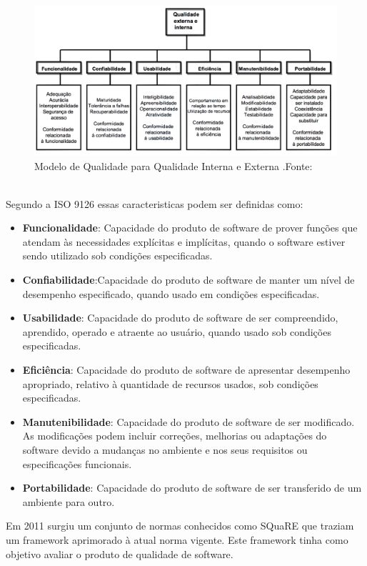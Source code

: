  \graphicspath{{figuras/}}
\begin{figure}
\centering
\includegraphics[scale=0.50]{Modelo_de_Qualidade}
\caption{Modelo de Qualidade para Qualidade Interna e Externa .Fonte:\cite{_nbr_2016}}
\label{img:modelo_qualidade}
\end{figure}
\\Segundo a ISO 9126 essas caracteristicas podem ser definidas como:
\begin{itemize}
\item \textbf{Funcionalidade}: Capacidade do produto de software de prover funções que atendam às necessidades explícitas e implícitas, quando o software estiver sendo utilizado sob condições especificadas.
\item \textbf{Confiabilidade}:Capacidade do produto de software de manter um nível de desempenho especificado, quando usado em condições especificadas.
\item \textbf{Usabilidade}: Capacidade do produto de software de ser compreendido, aprendido, operado e atraente ao usuário, quando usado sob condições especificadas.
\item \textbf{Eficiência}: Capacidade do produto de software de apresentar desempenho apropriado, relativo à quantidade de recursos usados, sob condições especificadas.
\item \textbf{Manutenibilidade}: Capacidade do produto de software de ser modificado. As modificações podem incluir correções, melhorias ou adaptações do software devido a mudanças no ambiente e nos seus requisitos ou especificações funcionais.
\item \textbf{Portabilidade}: Capacidade do produto de software de ser transferido de um ambiente para outro.
\end{itemize}
Em 2011 surgiu um conjunto de normas conhecidos como SQuaRE que traziam um framework aprimorado à atual norma vigente. Este framework tinha como objetivo avaliar o produto de qualidade de software.

